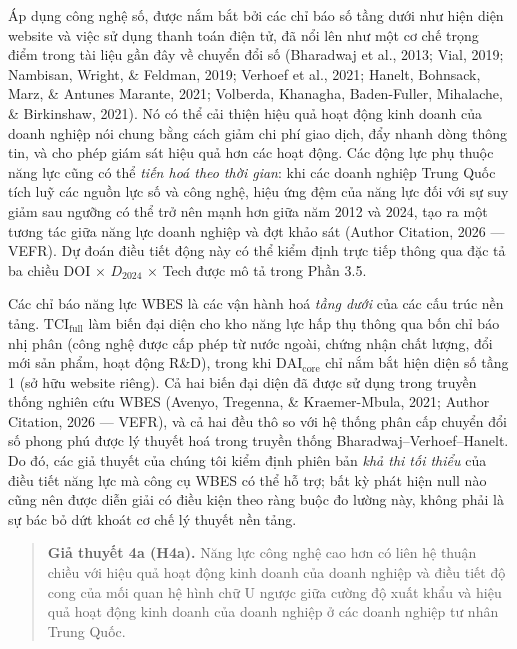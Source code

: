 \documentclass[12pt,a4paper]{article}
\begin{document}
Áp dụng công nghệ số, được nắm bắt bởi các chỉ báo số tầng dưới như hiện
diện website và việc sử dụng thanh toán điện tử, đã nổi lên như một cơ
chế trọng điểm trong tài liệu gần đây về chuyển đổi số (Bharadwaj et
al., 2013; Vial, 2019; Nambisan, Wright, \& Feldman, 2019; Verhoef et
al., 2021; Hanelt, Bohnsack, Marz, \& Antunes Marante, 2021; Volberda,
Khanagha, Baden-Fuller, Mihalache, \& Birkinshaw, 2021). Nó có thể cải
thiện hiệu quả hoạt động kinh doanh của doanh nghiệp nói chung bằng cách
giảm chi phí giao dịch, đẩy nhanh dòng thông tin, và cho phép giám sát
hiệu quả hơn các hoạt động. Các động lực phụ thuộc năng lực cũng có thể
\emph{tiến hoá theo thời gian}: khi các doanh nghiệp Trung Quốc tích luỹ
các nguồn lực số và công nghệ, hiệu ứng đệm của năng lực đối với sự suy
giảm sau ngưỡng có thể trở nên mạnh hơn giữa năm 2012 và 2024, tạo ra
một tương tác giữa năng lực doanh nghiệp và đợt khảo sát (Author
Citation, 2026 --- VEFR). Dự đoán điều tiết động này có thể kiểm định
trực tiếp thông qua đặc tả ba chiều DOI × \(D_{2024}\) × Tech được mô tả
trong Phần 3.5.

Các chỉ báo năng lực WBES là các vận hành hoá \emph{tầng dưới} của các
cấu trúc nền tảng. \(\mathrm{TCI}_{\text{full}}\) làm biến đại diện cho
kho năng lực hấp thụ thông qua bốn chỉ báo nhị phân (công nghệ được cấp
phép từ nước ngoài, chứng nhận chất lượng, đổi mới sản phẩm, hoạt động
R\&D), trong khi \(\mathrm{DAI}_{\text{core}}\) chỉ nắm bắt hiện diện số
tầng 1 (sở hữu website riêng). Cả hai biến đại diện đã được sử dụng
trong truyền thống nghiên cứu WBES (Avenyo, Tregenna, \& Kraemer-Mbula,
2021; Author Citation, 2026 --- VEFR), và cả hai đều thô so với hệ thống
phân cấp chuyển đổi số phong phú được lý thuyết hoá trong truyền thống
Bharadwaj--Verhoef--Hanelt. Do đó, các giả thuyết của chúng tôi kiểm
định phiên bản \emph{khả thi tối thiểu} của điều tiết năng lực mà công
cụ WBES có thể hỗ trợ; bất kỳ phát hiện null nào cũng nên được diễn giải
có điều kiện theo ràng buộc đo lường này, không phải là sự bác bỏ dứt
khoát cơ chế lý thuyết nền tảng.

\begin{quote}
\textbf{Giả thuyết 4a (H4a).} Năng lực công nghệ cao hơn có liên hệ
thuận chiều với hiệu quả hoạt động kinh doanh của doanh nghiệp và điều
tiết độ cong của mối quan hệ hình chữ U ngược giữa cường độ xuất khẩu và
hiệu quả hoạt động kinh doanh của doanh nghiệp ở các doanh nghiệp tư
nhân Trung Quốc.
\end{quote}
\end{document}
